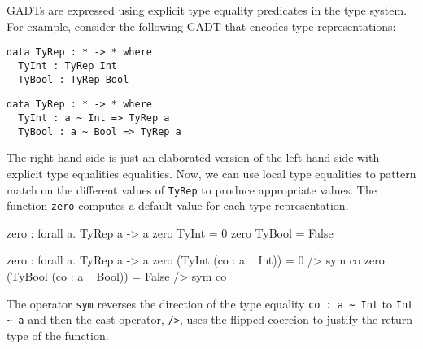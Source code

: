 \documentclass[screen,nonacm,manuscript,review]{acmart} %
\begin{document}
\section{\SFK}\label{sec:sfk} %
GADTs are expressed using explicit type equality predicates in the type system. For example, consider the following GADT that encodes type representations:

\begin{minipage}[ht]{0.5\linewidth}
\begin{lstlisting}
data TyRep : * -> * where
  TyInt : TyRep Int
  TyBool : TyRep Bool
\end{lstlisting}
\end{minipage}%
\begin{minipage}[ht]{0.5\linewidth}
\begin{lstlisting}
data TyRep : * -> * where
  TyInt : a ~ Int => TyRep a
  TyBool : a ~ Bool => TyRep a
\end{lstlisting}
\end{minipage}

The right hand side is just an elaborated version of the left hand side with explicit type equalities equalities.
Now, we can use local type equalities to pattern match on the different values of \lstinline{TyRep} to produce appropriate values. The function \lstinline{zero} computes a default value for each type representation.

\begin{minipage}{0.5\linewidth}
 \begin{codef}
 zero : forall a. TyRep a -> a
 zero TyInt = 0
 zero TyBool = False
 \end{codef}
\end{minipage}%
\begin{minipage}{0.5\linewidth}
 \begin{codef}
 zero : forall a. TyRep a -> a
 zero (TyInt (co : a ~ Int)) = 0 /> sym co
 zero (TyBool (co : a ~ Bool)) = False /> sym co
 \end{codef}
\end{minipage}

The operator \lstinline|sym| reverses the direction of the type equality \lstinline|co : a ~ Int| to \lstinline|Int ~ a| and then the cast operator, \lstinline{/>}, uses the flipped coercion to justify the return type of the function.
\end{document}
